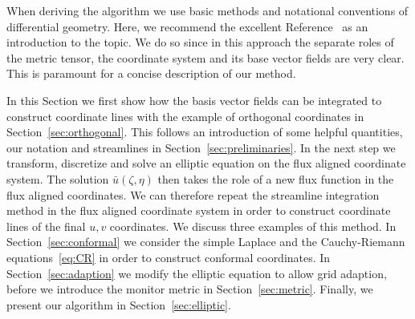 When deriving the algorithm we use basic methods and notational 
conventions of differential geometry.  
Here, we recommend the excellent Reference~\cite{Frankel} as an introduction to the topic.  
We do so since in this approach the separate roles of the metric tensor, 
the coordinate system and its base vector fields are very clear. This is 
paramount for a concise description of our method. 


In this Section we first show how the
basis vector fields can be integrated to construct coordinate lines
 with the example of orthogonal coordinates in Section~\ref{sec:orthogonal}. This follows
an introduction of some helpful quantities, our notation and streamlines
in Section~\ref{sec:preliminaries}. 
In the next step we transform, discretize and solve an elliptic equation on the flux aligned
coordinate system.
The solution $\bar u(\zeta, \eta)$ then takes the role of a new flux function in the flux aligned coordinates. 
We can therefore repeat the streamline integration method in the flux aligned
coordinate system in order to construct coordinate lines of the final $u,v$ coordinates.
We discuss three examples of this method.
In 
Section~\ref{sec:conformal} we consider the simple Laplace and the Cauchy-Riemann equations~\eqref{eq:CR}
in order to construct conformal coordinates.
In Section~\ref{sec:adaption} we modify the elliptic equation to allow grid adaption, before
we introduce the monitor metric in Section~\ref{sec:metric}. 
Finally, we present our algorithm in Section~\ref{sec:elliptic}. 

